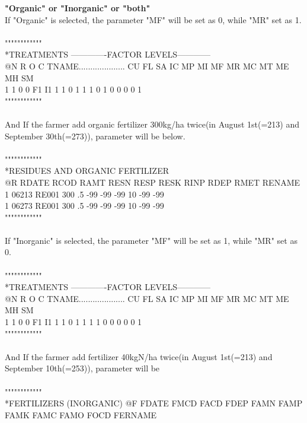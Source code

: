 \documentclass[11pt,a4j]{jarticle}
\begin{document}
{\bf "Organic" or "Inorganic" or "both"}\\

If "Organic" is selected, the parameter "MF" will be set as 0, while "MR" set as 1.\\
\\
""""""""""""\\
*TREATMENTS                        -------------FACTOR LEVELS------------\\
@N R O C TNAME.................... CU FL SA IC MP MI MF MR MC MT ME MH SM\\
 1 1 0 0 F1 I1                      1  1  0  1  1  1  0  1  0  0  0  0  1\\
 """"""""""""\\
\\
And If the farmer add organic fertilizer 300kg/ha twice(in August 1st(=213) and September 30th(=273)), parameter will be below.\\
\\
""""""""""""\\
*RESIDUES AND ORGANIC FERTILIZER\\
@R RDATE  RCOD  RAMT  RESN  RESP  RESK  RINP  RDEP  RMET RENAME\\
 1 06213 RE001   300    .5   -99   -99   -99    10   -99 -99\\
 1 06273 RE001   300    .5   -99   -99   -99    10   -99 -99\\
 """"""""""""\\
\\
If "Inorganic" is selected, the parameter "MF" will be set as 1, while "MR" set as 0.\\
\\
""""""""""""\\
*TREATMENTS                        -------------FACTOR LEVELS------------\\
@N R O C TNAME.................... CU FL SA IC MP MI MF MR MC MT ME MH SM\\
 1 1 0 0 F1 I1                      1  1  0  1  1  1  1  0  0  0  0  0  1\\
""""""""""""\\ 
\\
And If the farmer add fertilizer 40kgN/ha twice(in August 1st(=213) and September 10th(=253)), parameter will be\\
\\
""""""""""""\\
*FERTILIZERS (INORGANIC)
@F FDATE  FMCD  FACD  FDEP  FAMN  FAMP  FAMK  FAMC  FAMO  FOCD FERNAME\\
\end{document}
